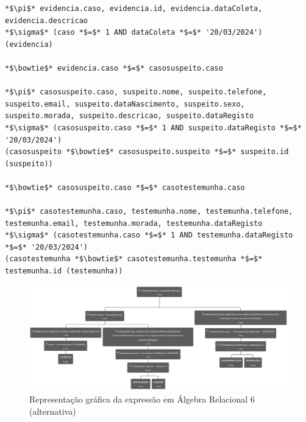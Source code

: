 \documentclass[a4paper,12pt]{scrreprt}
\begin{document}
\vspace{0.2cm}
\begin{lstlisting}[escapechar=*]
*$\pi$* evidencia.caso, evidencia.id, evidencia.dataColeta, evidencia.descricao
*$\sigma$* (caso *$=$* 1 AND dataColeta *$=$* '20/03/2024') (evidencia)

*$\bowtie$* evidencia.caso *$=$* casosuspeito.caso

*$\pi$* casosuspeito.caso, suspeito.nome, suspeito.telefone, suspeito.email, suspeito.dataNascimento, suspeito.sexo, suspeito.morada, suspeito.descricao, suspeito.dataRegisto
*$\sigma$* (casosuspeito.caso *$=$* 1 AND suspeito.dataRegisto *$=$* '20/03/2024')
(casosuspeito *$\bowtie$* casosuspeito.suspeito *$=$* suspeito.id (suspeito))

*$\bowtie$* casosuspeito.caso *$=$* casotestemunha.caso

*$\pi$* casotestemunha.caso, testemunha.nome, testemunha.telefone, testemunha.email, testemunha.morada, testemunha.dataRegisto
*$\sigma$* (casotestemunha.caso *$=$* 1 AND testemunha.dataRegisto *$=$* '20/03/2024')
(casotestemunha *$\bowtie$* casotestemunha.testemunha *$=$* testemunha.id (testemunha))
\end{lstlisting}


\begin{figure}[!ht]
    \centering
    \includegraphics[scale=16, angle=270]{images/relax/6-example.png}
    \caption{Representação gráfica da expressão em Álgebra Relacional 6 (alternativa)}
    \label{fig:4.11}
\end{figure}



\end{document}
